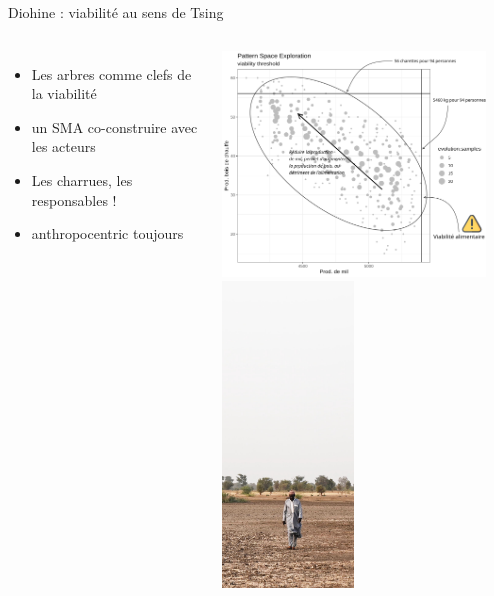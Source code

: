 \documentclass[newPxFont]{beamer}
\begin{document}
\begin{frame}[c]{Diohine : viabilité au sens de Tsing}
  \vspace{-1cm}
  \begin{columns}[onlytextwidth,T]
    \column{\dimexpr\linewidth-30mm-5mm}
        \begin{itemize}
          \item Les arbres comme clefs de la viabilité
          \item un SMA co-construire avec les acteurs
          \item Les charrues, les responsables ! 
          \item anthropocentric toujours
        \end{itemize}
        \includegraphics[width=7cm]{img/pse.png}
    \column{30mm}
    \vspace{0.5cm}
          \includegraphics[width=3.5cm]{img/diohine.jpg}
  \end{columns}
\end{frame}
\end{document}
